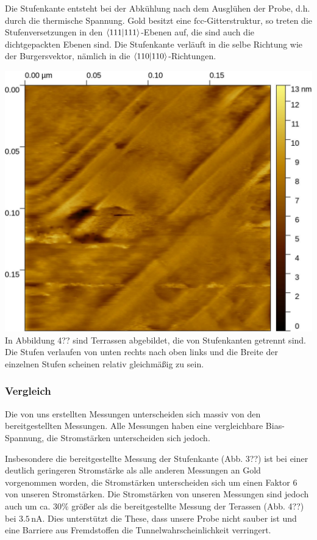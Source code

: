 \documentclass[12pt,a4paper]{scrartcl}
\numberwithin{equation}{section} %
\begin{document}
Die Stufenkante entsteht bei der Abkühlung nach dem Ausglühen der Probe,
d.h. durch die thermische Spannung. Gold besitzt eine
$\mathrm{fcc}$-Gitterstruktur, so treten die Stufenversetzungen in den
$\braket{111}$-Ebenen auf, die sind auch die dichtgepackten Ebenen
sind. Die Stufenkante verläuft in die selbe Richtung wie der
Burgersvektor, nämlich in die $\braket{110}$-Richtungen.

\includegraphics{../media/B2.5/Gold.pdf} In Abbildung 4?? sind Terrassen abgebildet,
die von Stufenkanten getrennt sind. Die Stufen verlaufen von unten
rechts nach oben links und die Breite der einzelnen Stufen scheinen
relativ gleichmäßig zu sein.

\hypertarget{vergleich}{%
\subsubsection{Vergleich}\label{vergleich}}

Die von uns erstellten Messungen unterscheiden sich massiv von den
bereitgestellten Messungen. Alle Messungen haben eine vergleichbare
Bias-Spannung, die Stromstärken unterscheiden sich jedoch.

Insbesondere die bereitgestellte Messung der Stufenkante (Abb. 3??) ist
bei einer deutlich geringeren Stromstärke als alle anderen Messungen an
Gold vorgenommen worden, die Stromstärken unterscheiden sich um einen
Faktor $6$ von unseren Stromstärken. Die Stromstärken von unseren
Messungen sind jedoch auch um ca. $30\%$ größer als die
bereitgestellte Messung der Terassen (Abb. 4??) bei
$3.5 \mathrm{\,nA}$. Dies unterstützt die These, dass unsere Probe
nicht sauber ist und eine Barriere aus Fremdstoffen die
Tunnelwahrscheinlichkeit verringert.
\end{document}
